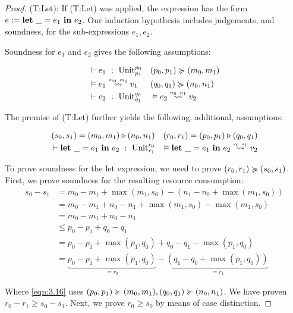 \begin{proof}
   (T:Let):  If (T:Let) was applied, the expression has the form \(e := \mathbf{let}~\_ = e_1~\mathbf{in}~e_2\). Our induction hypothesis includes judgements, and soundness, for the sub-expressions \(e_1, e_2\). 

   Soundness for \(e_1\) and \(e_2\) gives the following assumptions:

   \begin{align*}
      &\typing{}{e_1}{\ratype{\unit}{p_0}{p_1}}                   & &(p_0, p_1)\relaxation (m_0, m_1)\\
      &\evals{}{e_1}{v_1}{m_0}{m_1}                               & &(q_0, q_1)\relaxation (n_0, n_1)\\
      &\typing{}{e_2}{\ratype{\unit}{q_0}{q_1}}                   & &\evals{}{e_2}{v_2}{n_0}{n_1}\\
   \end{align*}

   The premise of (T:Let) further yields the following, additional, assumptions:

   \begin{align*}
      (s_0, s_1) = (m_0, m_1) \sequence (n_0, n_1) & & (r_0, r_1) = (p_0, p_1) \sequence (q_0, q_1)\\
      \typing{}{\letexp{\_}{e_1}{e_2}}{\ratype{\unit}{r_0}{r_1}} & &\evals{}{\letexp{\_}{e_1}{e_2}}{v_2}{s_0}{s_1}
   \end{align*}

   To prove soundness for the let expression, we need to prove \((r_0, r_1) \succcurlyeq (s_0, s_1)\). First, we prove soundness for the resulting resource consumption:
   \begin{align}
      s_0 - s_1   &= m_0 - m_1 + \max(m_1, s_0) - (n_1 - n_0 + \max(m_1, s_0)) \\
                  &= m_0 - m_1 + n_0 - n_1 + \max(m_1, s_0) - \max(m_1, s_0) \\
                  &= m_0 - m_1 + n_0 - n_1 \\
                  &\leq p_0 - p_1 + q_0 - q_1 \label{eqn:3.16}\\
                  &= p_0 - p_1 + \max(p_1, q_0) + q_0 - q_1 - \max(p_1, q_0) \\
                  &= \underbrace{p_0 - p_1 + \max(p_1, q_0)}_{= r_0} - \underbrace{(q_1 - q_0 + \max(p_1, q_0))}_{= r_1}
   \end{align}

   Where \cref{eqn:3.16} uses \((p_0, p_1) \succcurlyeq (m_0, m_1), (q_0, q_1) \succcurlyeq (n_0, n_1)\). We have proven \(r_0 - r_1 \geq s_0 - s_1\). Next, we prove \(r_0 \geq s_0\) by means of case distinction. 
   

\end{proof}

